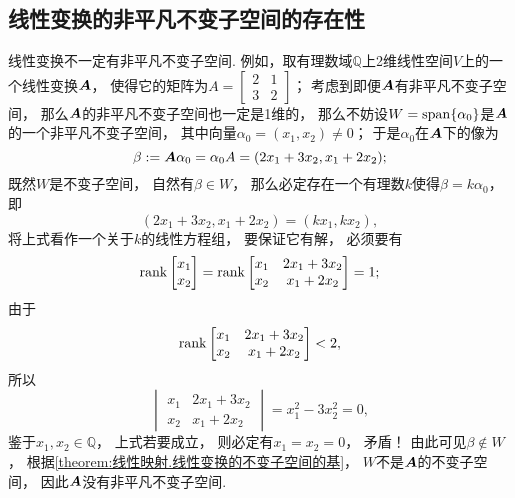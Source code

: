\subsection{线性变换的非平凡不变子空间的存在性}
线性变换不一定有非平凡不变子空间.
例如，取有理数域\(\mathbb{Q}\)上2维线性空间\(V\)上的一个线性变换\(\boldsymbol{A}\)，
使得它的矩阵为\(A = \begin{bmatrix}
	2 & 1 \\
	3 & 2
\end{bmatrix}\)；
考虑到即便\(\boldsymbol{A}\)有非平凡不变子空间，
那么\(\boldsymbol{A}\)的非平凡不变子空间也一定是1维的，
那么不妨设\(W = \operatorname{span}\{\alpha_0\}\)是\(\boldsymbol{A}\)的一个非平凡不变子空间，
其中向量\(\alpha_0=(x_1,x_2)\neq0\)；
于是\(\alpha_0\)在\(\boldsymbol{A}\)下的像为\begin{equation*}
	\beta
	:= \boldsymbol{A} \alpha_0
	= \alpha_0 A
	= (2x_1+3x_2,x_1+2x_2);
\end{equation*}
既然\(W\)是不变子空间，
自然有\(\beta \in W\)，
那么必定存在一个有理数\(k\)使得\(\beta = k \alpha_0\)，
即\begin{equation*}
	(2x_1+3x_2,x_1+2x_2)=(k x_1,k x_2),
\end{equation*}
将上式看作一个关于\(k\)的线性方程组，
要保证它有解，
必须要有\[
	\rank\begin{bmatrix}
		x_1 \\ x_2
	\end{bmatrix}
	= \rank\begin{bmatrix}
		x_1 & 2x_1+3x_2 \\
		x_2 & x_1+2x_2
	\end{bmatrix}
	= 1;
\]
由于\[
	\rank\begin{bmatrix}
		x_1 & 2x_1+3x_2 \\
		x_2 & x_1+2x_2
	\end{bmatrix}
	< 2,
\]
所以\begin{equation*}
	\begin{vmatrix}
		x_1 & 2x_1+3x_2 \\
		x_2 & x_1+2x_2
	\end{vmatrix}
	= x_1^2 - 3x_2^2
	= 0,
\end{equation*}
鉴于\(x_1,x_2 \in \mathbb{Q}\)，
上式若要成立，
则必定有\(x_1 = x_2 = 0\)，
矛盾！
由此可见\(\beta \notin W\)，
根据\cref{theorem:线性映射.线性变换的不变子空间的基}，
\(W\)不是\(\boldsymbol{A}\)的不变子空间，
因此\(\boldsymbol{A}\)没有非平凡不变子空间.

